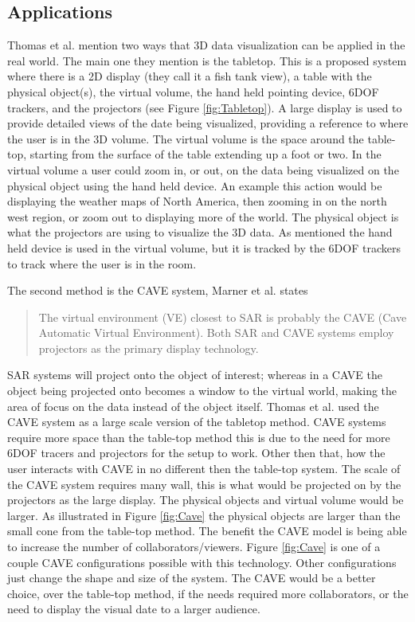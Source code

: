 \documentclass{sig-alternate}
\begin{document}
\subsection{Applications}
\label{sec:3D Applications}
Thomas et al. \cite{3D} mention two ways that 3D data visualization can be applied in the real world. The main one they mention is the tabletop. This is a proposed system where there is a 2D display (they call it a fish tank view), a table with the physical object(s), the virtual volume, the hand held pointing device, 6DOF trackers, and the projectors (see Figure \ref{fig:Tabletop}). A large display is used to provide detailed views of the date being visualized, providing a reference to where the user is in the 3D volume. The virtual volume is the space around the table-top, starting from the surface of the table extending up a foot or two. In the virtual volume a user could zoom in, or out, on the data being visualized on the physical object using the hand held device. An example this action would be displaying the weather maps of North America, then zooming in on the north west region, or zoom out to displaying more of the world. The physical object is what the projectors are using to visualize the 3D data. As mentioned the hand held device is used in the virtual volume, but it is tracked by the 6DOF trackers to track where the user is in the room.

The second method is the CAVE system, Marner et al. \cite{CAVE} states
\begin{quote}
	The virtual environment (VE) closest to SAR is probably the CAVE (Cave Automatic Virtual Environment). Both SAR and CAVE systems employ projectors as the primary display technology. \cite{CAVE}
\end{quote}
SAR systems will project onto the object of interest; whereas in a CAVE the object being projected onto becomes a window to the virtual world, making the area of focus on the data instead of the object itself. Thomas et al. \cite{3D} used the CAVE system as a large scale version of the tabletop method. CAVE systems require more space than the table-top method this is due to the need for more 6DOF tracers and projectors for the setup to work. Other then that, how the user interacts with CAVE in no different then the table-top system. The scale of the CAVE system requires many wall, this is what would be projected on by the projectors as the large display. The physical objects and virtual volume would be larger. As illustrated in Figure \ref{fig:Cave} the physical objects are larger than the small cone from the table-top method. The benefit the CAVE model is being able to increase the number of collaborators/viewers. Figure \ref{fig:Cave} is one of a couple CAVE configurations possible with this technology. Other configurations just change the shape and size of the system. The CAVE would be a better choice, over the table-top method, if the needs required more collaborators, or the need to display the visual date to a larger audience. 
\end{document}

